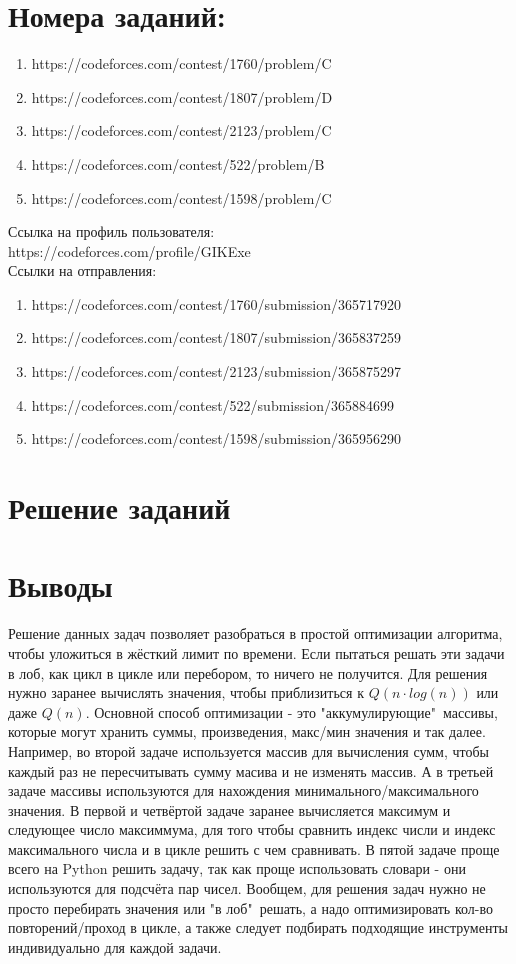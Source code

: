 \documentclass[oneside,a4paper,14pt]{extarticle} %
\begin{document}
	\section*{Номера заданий:}
	\begin{enumerate}
		\item https://codeforces.com/contest/1760/problem/C
		\item https://codeforces.com/contest/1807/problem/D
		\item https://codeforces.com/contest/2123/problem/C
		\item https://codeforces.com/contest/522/problem/B
		\item https://codeforces.com/contest/1598/problem/C
	\end{enumerate}
	\noindent Ссылка на профиль пользователя:\\
	\indent https://codeforces.com/profile/GIKExe \\
	\noindent Ссылки на отправления:
	\begin{enumerate}
		\item https://codeforces.com/contest/1760/submission/365717920
		\item https://codeforces.com/contest/1807/submission/365837259
		\item https://codeforces.com/contest/2123/submission/365875297
		\item https://codeforces.com/contest/522/submission/365884699
		\item https://codeforces.com/contest/1598/submission/365956290
	\end{enumerate}
	\newpage
	\section*{Решение заданий}
	
	\section*{Выводы} Решение данных задач позволяет разобраться в простой оптимизации алгоритма,
	чтобы уложиться в жёсткий лимит по времени. Если пытаться решать эти задачи в лоб, как цикл в цикле или перебором,
	то ничего не получится. Для решения нужно заранее вычислять значения, чтобы приблизиться к $Q(n \cdot log(n))$ или даже $Q(n)$. 
	Основной способ оптимизации - это "аккумулирующие"\ массивы, которые могут хранить суммы, произведения, макс/мин значения и так далее.
	Например, во второй задаче используется массив для вычисления сумм, чтобы каждый раз не пересчитывать сумму масива и не изменять массив.
	А в третьей задаче массивы используются для нахождения минимального/максимального значения. В первой и четвёртой задаче заранее вычисляется
	максимум и следующее число максиммума, для того чтобы сравнить индекс числи и индекс максимального числа и в цикле решить с чем сравнивать.
	В пятой задаче проще всего на Python решить задачу, так как проще использовать словари - они используются для подсчёта пар чисел.
	Вообщем, для решения задач нужно не просто перебирать значения или "в лоб"\ решать, а надо оптимизировать кол-во повторений/проход в цикле,
	а также следует подбирать подходящие инструменты индивидуально для каждой задачи.

	
\end{document}
